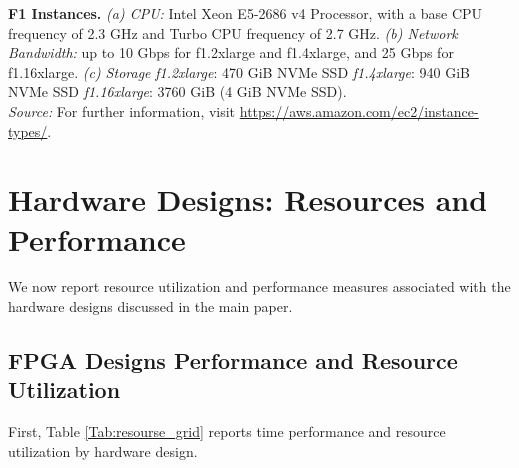 \documentclass[12pt,american]{article}
\begin{document}
\noindent \textbf{F1 Instances.} 
\textit{(a) CPU:} Intel Xeon E5-2686 v4 Processor, with a base CPU frequency of 2.3 GHz and Turbo CPU frequency of 2.7 GHz.
\textit{(b) Network Bandwidth:} up to 10 Gbps for f1.2xlarge and f1.4xlarge, and 25 Gbps for f1.16xlarge.
\textit{(c) Storage} 
\textit{f1.2xlarge}: 470 GiB NVMe SSD
\textit{f1.4xlarge}: 940 GiB NVMe SSD
\textit{f1.16xlarge}: 3760 GiB (4  GiB NVMe SSD).\\
\textit{Source:} For further information, visit \href{https://aws.amazon.com/ec2/instance-types/}{https://aws.amazon.com/ec2/instance-types/}.

\section{Hardware Designs: Resources and Performance}\label{app:perf}

We now report resource utilization and performance measures associated with the hardware designs discussed in the main paper.

\subsection{FPGA Designs Performance and Resource Utilization}\label{app:resuti}

First, Table \ref{Tab:resourse_grid} reports time performance and resource utilization by hardware design.
\end{document}
